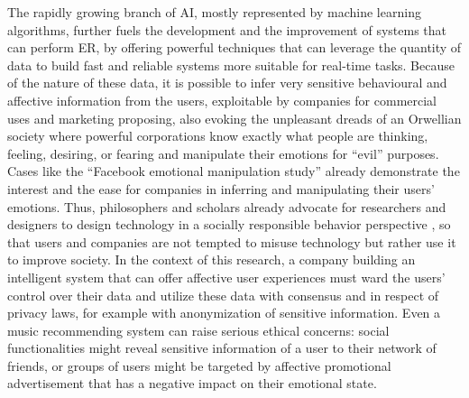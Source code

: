 The rapidly growing branch of \ac{AI}, mostly represented by machine learning algorithms, further fuels the development and the improvement of systems that can perform ER, by offering powerful techniques that can leverage the quantity of data to build fast and reliable systems more suitable for real-time tasks. Because of the nature of these data, it is possible to infer very sensitive behavioural and affective information from the users, exploitable by companies for commercial uses and marketing proposing, also evoking the unpleasant dreads of an Orwellian society where powerful corporations know exactly what people are thinking, feeling, desiring, or fearing and manipulate their emotions for “evil” purposes. Cases like the “Facebook emotional manipulation study” \cite{gertz_autonomy_2016} already demonstrate the interest and the ease for companies in inferring and manipulating their users’ emotions. Thus, philosophers and scholars already advocate for researchers and designers to design technology in a socially responsible behavior perspective 	\cite{tromp_design_2011}, so that users and companies are not tempted to misuse technology but rather use it to improve society. In the context of this research, a company building an intelligent system that can offer affective user experiences must ward the users’ control over their data and utilize these data with consensus and in respect of privacy laws, for example with anonymization of sensitive information. Even a music recommending system can raise serious ethical concerns: social functionalities might reveal sensitive information of a user to their network of friends, or groups of users might be targeted by affective promotional advertisement that has a negative impact on their emotional state.


